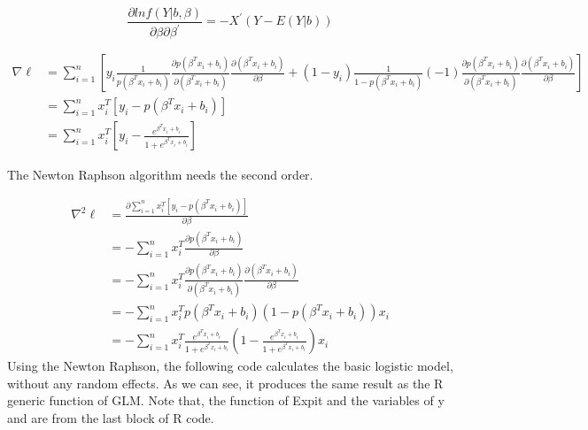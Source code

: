 \documentclass[]{book}
\begin{document}
\[\frac{\partial lnf(Y|b, \beta)}{\partial \beta \partial \beta^{'}}=-X^{'}(Y-E(Y|b))\]

\[\begin{aligned} \nabla \ell &= \sum_{i=1}^{n} [y_i \frac{1}{p(\beta ^T x_i+b_i)} \frac{\partial p(\beta ^T x_i+b_i)}{\partial (\beta ^T x_i+b_i)}\frac{\partial (\beta ^T x_i+b_i)}{\partial \beta}+(1-y_i) \frac{1}{1-p(\beta ^T x_i+b_i)}(-1)\frac{\partial p(\beta ^T x_i+b_i)}{\partial (\beta ^T x_i+b_i)}\frac{\partial (\beta ^T x_i+b_i)}{\partial \beta}] \\ &=\sum_{i=1}^{n} x_i^T[y_i-p(\beta ^T x_i+b_i)] \\ &= \sum_{i=1}^{n} x_i^T[y_i-\frac{e^{\beta^Tx_i+b_i}}{1+e^{\beta^Tx_i+b_i}}] \end{aligned}\]

The Newton Raphson algorithm needs the second order.

\[\begin{aligned} \nabla^2 \ell &=\frac{\partial \sum_{i=1}^{n} x_i^T[y_i-p(\beta ^T x_i+b_i)]}{\partial \beta} \\ &=-\sum_{i=1}^{n} x_i^T\frac{\partial p(\beta ^T x_i+b_i) }{\partial \beta}\\ &=-\sum_{i=1}^{n} x_i^T\frac{\partial p(\beta ^T x_i+b_i) }{\partial (\beta^Tx_i+b_i)} \frac{\partial (\beta^Tx_i+b_i)}{\partial \beta}\\ &=-\sum_{i=1}^{n} x_i^T p(\beta ^T x_i+b_i)(1-p(\beta ^T x_i+b_i))x_i \\ &=-\sum_{i=1}^{n} x_i^T \frac{e^{\beta^Tx_i+b_i}}{1+e^{\beta^Tx_i+b_i}}(1-\frac{e^{\beta^Tx_i+b_i}}{1+e^{\beta^Tx_i+b_i}})x_i \end{aligned}\]
Using the Newton Raphson, the following code calculates the basic
logistic model, without any random effects. As we can see, it produces
the same result as the R generic function of GLM. Note that, the
function of Expit and the variables of y and are from the last block of
R code.
\end{document}
